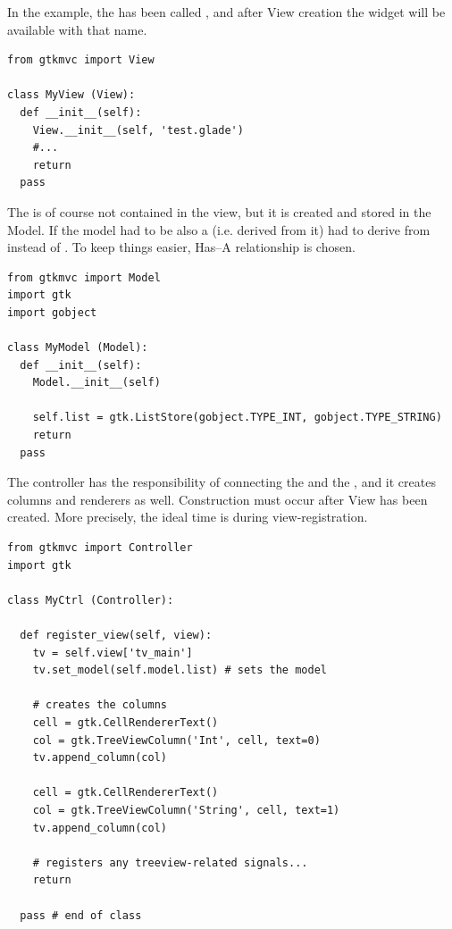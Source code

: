 In the example, the  has been called
, and after View creation the widget will be
available with that name.

{ \codesize 
\begin{verbatim}
from gtkmvc import View

class MyView (View):
  def __init__(self):
    View.__init__(self, 'test.glade')
    #...
    return
  pass 
\end{verbatim}
}

The  is of course not contained in the view, but
it is created and stored in the Model. If the model had to be also a
 (i.e.  derived from it)  had to
derive from  instead of
. To keep things easier, Has--A relationship is
chosen.

{ \codesize 
\begin{verbatim}
from gtkmvc import Model
import gtk
import gobject

class MyModel (Model):
  def __init__(self):
    Model.__init__(self)

    self.list = gtk.ListStore(gobject.TYPE_INT, gobject.TYPE_STRING)
    return
  pass 
\end{verbatim}
}

The controller has the responsibility of connecting the
 and the , and it creates
columns and renderers as well. Construction must occur after View has
been created. More precisely, the ideal time is during
view-registration.

{ \codesize 
\begin{verbatim}
from gtkmvc import Controller
import gtk

class MyCtrl (Controller):

  def register_view(self, view):
    tv = self.view['tv_main']    
    tv.set_model(self.model.list) # sets the model

    # creates the columns
    cell = gtk.CellRendererText()
    col = gtk.TreeViewColumn('Int', cell, text=0)
    tv.append_column(col)

    cell = gtk.CellRendererText()
    col = gtk.TreeViewColumn('String', cell, text=1)
    tv.append_column(col)

    # registers any treeview-related signals...
    return

  pass # end of class 
\end{verbatim}
}



